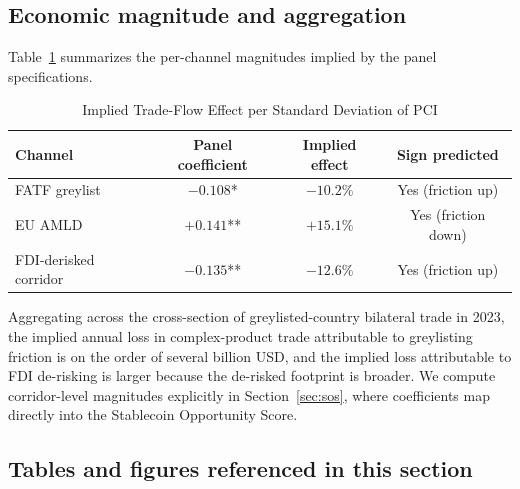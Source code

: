 \subsection{Economic magnitude and aggregation}
\label{subsec:magnitude}

Table~\ref{tab:magnitude} summarizes the per-channel magnitudes implied by the panel specifications.

\begin{table}[htbp]
\centering
\caption{Implied Trade-Flow Effect per Standard Deviation of PCI}
\label{tab:magnitude}
\begin{threeparttable}
\small
\begin{tabular}{lccc}
\toprule
Channel                  & Panel coefficient & Implied effect & Sign predicted \\
\midrule
FATF greylist            & $-0.108$* & $-10.2\%$ & Yes (friction up)   \\
EU AMLD                  & $+0.141$**& $+15.1\%$ & Yes (friction down) \\
FDI-derisked corridor    & $-0.135$**& $-12.6\%$ & Yes (friction up)   \\
\bottomrule
\end{tabular}
\begin{tablenotes}
\end{tablenotes}
\end{threeparttable}
\end{table}

Aggregating across the cross-section of greylisted-country bilateral trade in 2023, the implied annual loss in complex-product trade attributable to greylisting friction is on the order of several billion USD, and the implied loss attributable to FDI de-risking is larger because the de-risked footprint is broader. We compute corridor-level magnitudes explicitly in Section~\ref{sec:sos}, where coefficients map directly into the Stablecoin Opportunity Score.

\subsection{Tables and figures referenced in this section}

